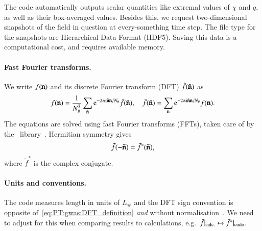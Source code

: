 The code automatically outputs scalar quantities like extremal values of $\chi$ and $q$, as well as their box-averaged values. Besides this, we request two-dimensional snapshots of the field in question at every-something time step. The file type for the snapshots are Hierarchical Data Format (HDF5). Saving this data is a computational cost, and requires available memory. %








\paragraph{Fast Fourier transforms.} %
We write $f(\boldsymbol{\mathtt{n}})$ and its discrete Fourier transform (DFT) $\tilde{f}(\tilde{\boldsymbol{\mathtt{n}}})$ as
\begin{equation}\label{eq:PT:gwas:DFT_definition}
    f(\lcoordx) = \frac{1}{N_\#^3} \sum_{\lcoordk } \eu[-2\ppi \im \lcoordk \lcoordx/N_\# ]\tilde{f}(\lcoordk) , \quad \tilde{f}(\lcoordk) = \sum_{\lcoordx} \eu[+2\ppi \im \lcoordk \lcoordx/N_\#  ]f(\lcoordx).
\end{equation}
The equations are solved using fast Fourier transforms (FFTs), taken care of by the~\latfield{} library~\citep{daverioLatfield2LibraryClassical2016}. Hermitian symmetry gives
\begin{equation}
    \tilde{f}(-\tilde{\boldsymbol{\mathtt{n}}}) =  \tilde{f}^\ast(\tilde{\boldsymbol{\mathtt{n}}}),
\end{equation}
where $\tilde{f}^\ast$ is the complex conjugate. 


\paragraph{Units and conventions.} %
The code measures length in units of $L_\#$ and the DFT sign convention is opposite of~\cref{eq:PT:gwas:DFT_definition} \emph{and} without normalisation~\citep{daverioLatfield2LibraryClassical2016,adamekGevolutionCosmologicalNbody2016}. We need to adjust for this when comparing results to calculations, e.g.~$\tilde{f}\rvert_\mathrm{calc.} \leftrightarrow \tilde{f}^\ast\rvert_\mathrm{code}$.





